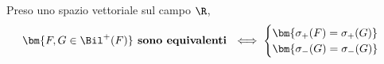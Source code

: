 \documentclass[11pt, a4paper, titlepage, oneside]{scrbook}
\begin{document}
\begin{Proposizione}[]
\label{propos-finale}
Preso uno spazio vettoriale sul campo $\R$,
\[
\bm{F,G \in \Bil^+(F)} \textbf{ sono equivalenti } \iff
\begin{cases}
\bm{\sigma_+(F) = \sigma_+(G)} & \\ 
\bm{\sigma_-(G) = \sigma_-(G)} & \\ 
\end{cases}
\]
\end{Proposizione}
\end{document}

